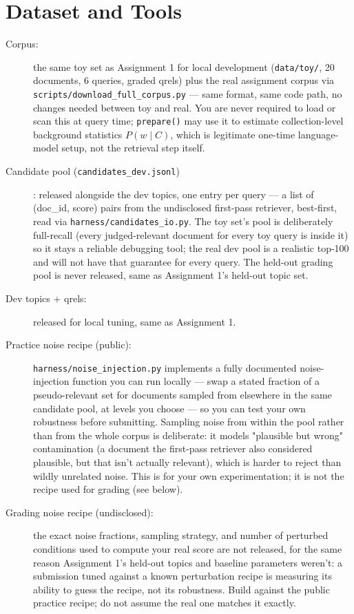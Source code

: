\documentclass[10pt]{article}
\begin{document}
\section{Dataset and Tools}
\begin{description}
\item [Corpus:] the same toy set as Assignment 1 for local development (\texttt{data/toy/}, 20 documents, 6 queries, graded qrels) plus the real assignment corpus via \texttt{scripts/download\_full\_corpus.py} — same format, same code path, no changes needed between toy and real. You are never required to load or scan this at query time; \texttt{prepare()} may use it to estimate collection-level background statistics $P\left(w \mid C\right)$, which is legitimate one-time language-model setup, not the retrieval step itself.
\item [Candidate pool (\texttt{candidates\_dev.jsonl})]: released alongside the dev topics, one entry per query — a list of (doc\_id, score) pairs from the undisclosed first-pass retriever, best-first, read via \texttt{harness/candidates\_io.py}. The toy set's pool is deliberately full-recall (every judged-relevant document for every toy query is inside it) so it stays a reliable debugging tool; the real dev pool is a realistic top-100 and will not have that guarantee for every query. The held-out grading pool is never released, same as Assignment 1's held-out topic set.
\item [Dev topics + qrels:] released for local tuning, same as Assignment 1.
\item [Practice noise recipe (public):] \texttt{harness/noise\_injection.py} implements a fully documented noise-injection function you can run locally — swap a stated fraction of a pseudo-relevant set for documents sampled from elsewhere in the same candidate pool, at levels you choose — so you can test your own robustness before submitting. Sampling noise from within the pool rather than from the whole corpus is deliberate: it models "plausible but wrong" contamination (a document the first-pass retriever also considered plausible, but that isn't actually relevant), which is harder to reject than wildly unrelated noise. This is for your own experimentation; it is not the recipe used for grading (see below).
\item [Grading noise recipe (undisclosed):] the exact noise fractions, sampling strategy, and number of perturbed conditions used to compute your real score are not released, for the same reason Assignment 1's held-out topics and baseline parameters weren't: a submission tuned against a known perturbation recipe is measuring its ability to guess the recipe, not its robustness. Build against the public practice recipe; do not assume the real one matches it exactly.

\end{description}
\end{document}
